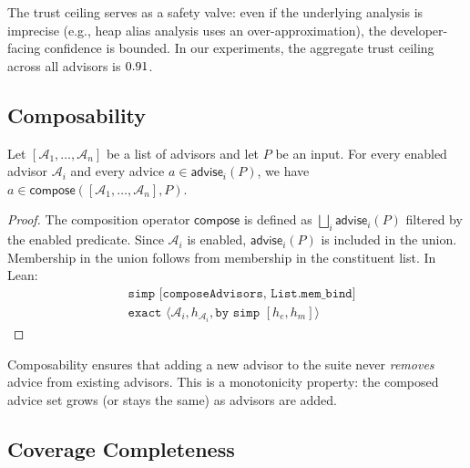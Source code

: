 \documentclass[11pt]{article}
\newcommand{\Adv}{\mathcal{A}}
\newcommand{\AdvisorOp}{\mathsf{advise}}
\newcommand{\ComposeOp}{\mathsf{compose}}
\begin{document}
The trust ceiling serves as a safety valve: even if the underlying
analysis is imprecise (e.g., heap alias analysis uses an
over-approximation), the developer-facing confidence is bounded.
In our experiments, the aggregate trust ceiling across all advisors
is $0.91{}$.

\subsection{Composability}\label{sec:composability}

\begin{theorem}\label{thm:composability}
Let $[\Adv_1, \ldots, \Adv_n]$ be a list of advisors and let $P$ be
an input.  For every enabled advisor $\Adv_i$ and every advice
$a \in \AdvisorOp_i(P)$, we have $a \in \ComposeOp([\Adv_1, \ldots,
\Adv_n], P)$.
\end{theorem}

\begin{proof}
The composition operator $\ComposeOp$ is defined as
$\bigsqcup_{i} \AdvisorOp_i(P)$ filtered by the enabled predicate.
Since $\Adv_i$ is enabled, $\AdvisorOp_i(P)$ is included in the
union.  Membership in the union follows from membership in the
constituent list.  In Lean:
\begin{align*}
  &\texttt{simp [composeAdvisors, List.mem\_bind]} \\
  &\texttt{exact } \langle \Adv_i, h_{\Adv_i}, \texttt{by simp }[h_e, h_m] \rangle
\end{align*}
\end{proof}

\begin{remark}
Composability ensures that adding a new advisor to the suite never
\emph{removes} advice from existing advisors.  This is a monotonicity
property: the composed advice set grows (or stays the same) as
advisors are added.
\end{remark}

\subsection{Coverage Completeness}\label{sec:coverage}
\end{document}
